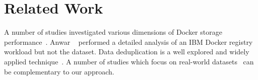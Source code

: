 \section{Related Work}
\label{sec:related}





A number of studies investigated various dimensions of Docker storage
performance~\cite{dockerssd,shifter,slacker,exoclones,docker-driver-eval,
improve-cow-container-drivers,cntr,slacker}.
%
%
%
%
Anwar \etal~\cite{dockerworkload} performed a detailed analysis
of an IBM Docker registry workload but not the dataset.
%
%
%
%
Data deduplication is a well
explored and widely applied technique~\cite{2009-sparse_indexing_inline_dedup_using_sampling-fast,
2001-low_bandwidth_network_fs-sosp,
2012-idedup-fast,
tarasov2014dmdedup,
2008-avoid_disk_bottleneck_data_domain_dedupfs-fast}.
%
A number of studies which focus on
real-world datasets~\cite{2009-dedup_effectiveness_on_vm_disk_images-systor,
2012-data_reduction_in_primary_storage-systor,
2012-hpc_practical_dedup_study-sc,
2013-charact_increment_changes_data_protect-atc,
msst16dedup-study,
2012-charact_backup_workloads-fast,
2013-charact_dedup_effic_big_data-iiswc}
 can be complementary to our approach.


